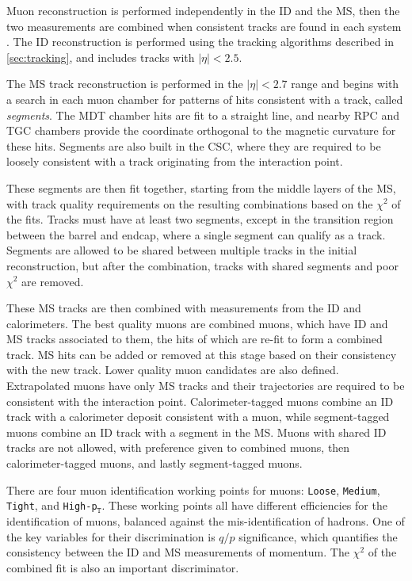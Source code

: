 Muon reconstruction is performed independently in the \ac{ID} and the \ac{MS}, then the two measurements are combined when consistent tracks are found in each system \cite{1603.05598}. The \ac{ID} reconstruction is performed using the tracking algorithms described in \autoref{sec:tracking}, and includes tracks with $|\eta|<2.5$. 

The \ac{MS} track reconstruction is performed in the $|\eta|<2.7$ range and begins with a search in each muon chamber for patterns of hits consistent with a track, called \textit{segments}. The \ac{MDT} chamber hits are fit to a straight line, and nearby \ac{RPC} and \ac{TGC} chambers provide the coordinate orthogonal to the magnetic curvature for these hits. Segments are also built in the \ac{CSC}, where they are required to be loosely consistent with a track originating from the interaction point. 

These segments are then fit together, starting from the middle layers of the \ac{MS}, with track quality requirements on the resulting combinations based on the $\chi^2$ of the fits. Tracks must have at least two segments, except in the transition region between the barrel and endcap, where a single segment can qualify as a track. Segments are allowed to be shared between multiple tracks in the initial reconstruction, but after the combination, tracks with shared segments and poor $\chi^2$ are removed.    

These \ac{MS} tracks are then combined with measurements from the \ac{ID} and calorimeters. The best quality muons are combined muons, which have \ac{ID} and \ac{MS} tracks associated to them, the hits of which are re-fit to form a combined track. \ac{MS} hits can be added or removed at this stage based on their consistency with the new track. Lower quality muon candidates are also defined. Extrapolated muons have only \ac{MS} tracks and their trajectories are required to be consistent with the interaction point. Calorimeter-tagged muons combine an \ac{ID} track with a calorimeter deposit consistent with a muon, while segment-tagged muons combine an \ac{ID} track with a segment in the \ac{MS}. Muons with shared \ac{ID} tracks are not allowed, with preference given to combined muons, then calorimeter-tagged muons, and lastly segment-tagged muons. 

There are four muon identification working points for muons: \texttt{Loose}, \texttt{Medium}, \texttt{Tight}, and \texttt{High-p$_\texttt{T}$}. These working points all have different efficiencies for the identification of muons, balanced against the mis-identification of hadrons. One of the key variables for their discrimination is $q/p$ significance, which quantifies the consistency between the \ac{ID} and \ac{MS} measurements of momentum. The $\chi^2$ of the combined fit is also an important discriminator. 

